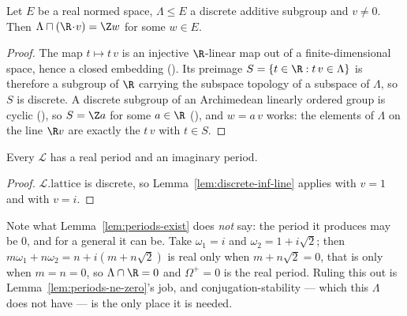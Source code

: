 \begin{lemma}
  \label{lem:discrete-inf-line}
  Let $E$ be a real normed space, $\Lambda \leq E$ a discrete additive subgroup and $v \neq 0$.
  Then $\Lambda \sqcap (\R\!\cdot\!v) = \Z w$ for some $w \in E$.
\end{lemma}
\begin{proof}
  The map $t \mapsto t\,v$ is an injective $\R$-linear map out of a finite-dimensional space,
  hence a closed embedding (). Its preimage
  $S = \{t \in \R : t\,v \in \Lambda\}$ is therefore a subgroup of $\R$ carrying the subspace
  topology of a subspace of $\Lambda$, so $S$ is discrete. A discrete subgroup of an
  Archimedean linearly ordered group is cyclic (),
  so $S = \Z a$ for some $a \in \R$
  (), and $w = a\,v$ works: the
  elements of $\Lambda$ on the line $\R v$ are exactly the $t\,v$ with $t \in S$.
\end{proof}

\begin{lemma}
  \label{lem:periods-exist}
  Every  $\mathcal{L}$ has a real period and an imaginary period.
\end{lemma}
\begin{proof}
  $\mathcal{L}.\mathrm{lattice}$ is discrete, so Lemma~\ref{lem:discrete-inf-line} applies with
  $v=1$ and with $v=i$.
\end{proof}

Note what Lemma~\ref{lem:periods-exist} does \emph{not} say: the period it produces may be $0$,
and for a general  it can be. Take $\omega_{1}=i$ and
$\omega_{2}=1+i\sqrt{2}$; then $m\omega_{1}+n\omega_{2} = n + i(m+n\sqrt{2})$ is real only when
$m+n\sqrt{2}=0$, that is only when $m=n=0$, so $\Lambda \cap \R = 0$ and $\Omega^{+}=0$ is the
real period. Ruling this out is Lemma~\ref{lem:periods-ne-zero}'s job, and conjugation-stability
--- which this $\Lambda$ does not have --- is the only place it is needed.

